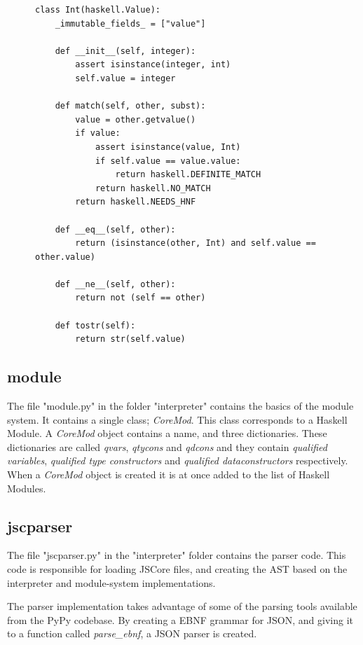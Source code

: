 \begin{figure}[H]
\lstset{ %
language=Python,
caption=Python class implementing the Haskell Int Value.,
label=lst:int1
}
\begin{lstlisting}
class Int(haskell.Value):
    _immutable_fields_ = ["value"]

    def __init__(self, integer):
        assert isinstance(integer, int)
        self.value = integer

    def match(self, other, subst):
        value = other.getvalue()
        if value:
            assert isinstance(value, Int)
            if self.value == value.value:
                return haskell.DEFINITE_MATCH
            return haskell.NO_MATCH
        return haskell.NEEDS_HNF

    def __eq__(self, other):
        return (isinstance(other, Int) and self.value == other.value)

    def __ne__(self, other):
        return not (self == other)

    def tostr(self):
        return str(self.value)
\end{lstlisting}
\end{figure}


\subsection{module}

The file "module.py" in the folder "interpreter" contains the basics of the
module system. It contains a single class; \emph{CoreMod}. This class corresponds
to a Haskell Module. A \emph{CoreMod} object contains a name, and three dictionaries.
These dictionaries are called \emph{qvars}, \emph{qtycons} and \emph{qdcons} and they
contain \emph{qualified variables}, \emph{qualified type constructors} and 
\emph{qualified dataconstructors} respectively. When a \emph{CoreMod} object is created
it is at once added to the list of Haskell Modules.

\subsection{jscparser}

The file "jscparser.py" in the "interpreter" folder contains the parser code. This
code is responsible for loading JSCore files, and creating the AST based on the
interpreter and module-system implementations.

The parser implementation takes advantage of some of the parsing tools available from
the PyPy codebase. By creating a EBNF grammar for JSON, and giving it to a function
called \emph{parse\_ebnf}, a JSON parser is created.

